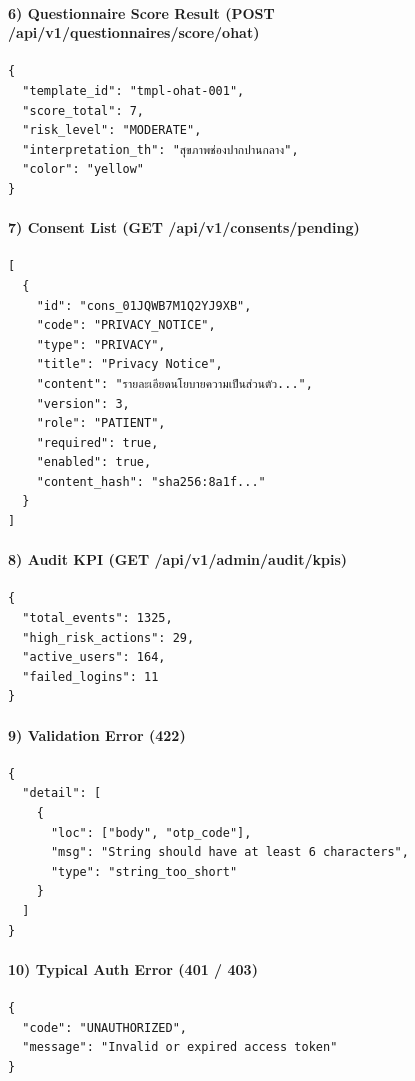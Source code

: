 \paragraph*{6) Questionnaire Score Result (POST /api/v1/questionnaires/score/ohat)}
\begin{verbatim}
{
  "template_id": "tmpl-ohat-001",
  "score_total": 7,
  "risk_level": "MODERATE",
  "interpretation_th": "สุขภาพช่องปากปานกลาง",
  "color": "yellow"
}
\end{verbatim}

\paragraph*{7) Consent List (GET /api/v1/consents/pending)}
\begin{verbatim}
[
  {
    "id": "cons_01JQWB7M1Q2YJ9XB",
    "code": "PRIVACY_NOTICE",
    "type": "PRIVACY",
    "title": "Privacy Notice",
    "content": "รายละเอียดนโยบายความเป็นส่วนตัว...",
    "version": 3,
    "role": "PATIENT",
    "required": true,
    "enabled": true,
    "content_hash": "sha256:8a1f..."
  }
]
\end{verbatim}

\paragraph*{8) Audit KPI (GET /api/v1/admin/audit/kpis)}
\begin{verbatim}
{
  "total_events": 1325,
  "high_risk_actions": 29,
  "active_users": 164,
  "failed_logins": 11
}
\end{verbatim}

\paragraph*{9) Validation Error (422)}
\begin{verbatim}
{
  "detail": [
    {
      "loc": ["body", "otp_code"],
      "msg": "String should have at least 6 characters",
      "type": "string_too_short"
    }
  ]
}
\end{verbatim}

\paragraph*{10) Typical Auth Error (401 / 403)}
\begin{verbatim}
{
  "code": "UNAUTHORIZED",
  "message": "Invalid or expired access token"
}
\end{verbatim}

